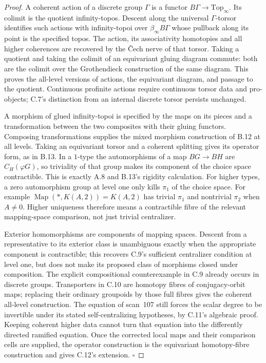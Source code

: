 \begin{proof}
A coherent action of a discrete group $\Gamma$ is a functor $B\Gamma\to\mathrm{Top}_\infty$. Its colimit is the quotient infinity-topos. Descent along the universal $\Gamma$-torsor identifies such actions with infinity-topoi over $\beta_\infty B\Gamma$ whose pullback along its point is the specified topos. The action, its associativity homotopies and all higher coherences are recovered by the \v Cech nerve of that torsor. Taking a quotient and taking the colimit of an equivariant gluing diagram commute: both are the colimit over the Grothendieck construction of the same diagram. This proves the all-level versions of actions, the equivariant diagram, and passage to the quotient. Continuous profinite actions require continuous torsor data and pro-objects; C.7's distinction from an internal discrete torsor persists unchanged.

A morphism of glued infinity-topoi is specified by the maps on its pieces and a transformation between the two composites with their gluing functors. Composing transformations supplies the mixed morphism construction of B.12 at all levels. Taking an equivariant torsor and a coherent splitting gives its operator form, as in B.13. In a $1$-type the automorphisms of a map $BG\to BH$ are $C_H(\varphi G)$, so triviality of that group makes its component of the choice space contractible. This is exactly A.8 and B.13's rigidity calculation. For higher types, a zero automorphism group at level one only kills $\pi_1$ of the choice space. For example
$\operatorname{Map}(*,K(A,2))=K(A,2)$ has trivial $\pi_1$ and nontrivial $\pi_2$ when $A\ne0$. Higher uniqueness therefore means a contractible fibre of the relevant mapping-space comparison, not just trivial centralizer.

Exterior homomorphisms are components of mapping spaces. Descent from a representative to its exterior class is unambiguous exactly when the appropriate component is contractible; this recovers C.9's sufficient centralizer condition at level one, but does not make its proposed class of morphisms closed under composition. The explicit compositional counterexample in C.9 already occurs in discrete groups. Transporters in C.10 are homotopy fibres of conjugacy-orbit maps; replacing their ordinary groupoids by those full fibres gives the coherent all-level construction. The equation of scan~107 still forces the scalar degree to be invertible under its stated self-centralizing hypotheses, by C.11's algebraic proof. Keeping coherent higher data cannot turn that equation into the differently directed ramified equation. Once the corrected local maps and their comparison cells are supplied, the operator construction is the equivariant homotopy-fibre construction and gives C.12's extension. \hfill$\square$
\end{proof}

